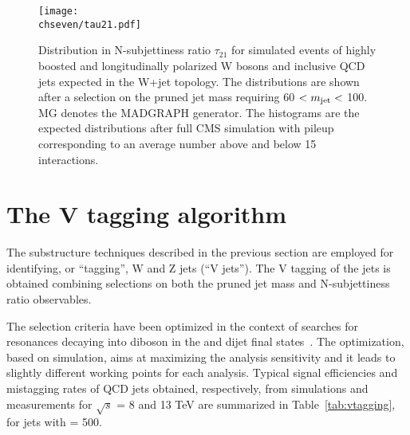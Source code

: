 \begin{figure}[!htb]
 \begin{center}
  \texttt{[image: \\chseven/tau21.pdf]}
 \end{center}
 \caption{\small Distribution in N-subjettiness ratio $\tau_{21}$ for simulated events of highly boosted and longitudinally polarized W bosons and inclusive QCD jets expected in the W+jet topology. The distributions are shown after a selection on the pruned jet mass requiring 60 $< m_{\text{jet}} <$ 100\GeV. MG denotes the MADGRAPH generator. The histograms are the expected distributions after full CMS simulation with pileup corresponding to an average number above and below 15 interactions.
 }
 \label{fig:tau21}
\end{figure}

\section{The V tagging algorithm}
\label{sec:vtagging}

The substructure techniques described in the previous section are employed for identifying, or ``tagging'', W and Z jets (``V jets''). The V tagging of the jets is obtained combining selections on both the pruned jet mass \mJ and N-subjettiness ratio \nsubj observables. %

The selection criteria have been optimized in the context of searches for resonances decaying into diboson in the \lnujet and dijet final states~\cite{Khachatryan:2014gha,Khachatryan:2014hpa,CMS-PAS-EXO-15-002}. The optimization, based on simulation, aims at maximizing the analysis sensitivity and it leads to slightly different working points for each analysis. Typical signal efficiencies and mistagging rates of QCD jets obtained, respectively, from simulations and measurements for $\sqrt{s}$ = 8 and 13 TeV are summarized in Table~\ref{tab:vtagging}, for jets with \pt = 500\GeV.

